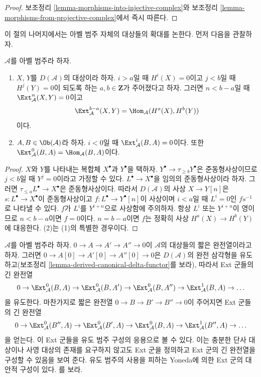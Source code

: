 \begin{proof}
보조정리 \ref{lemma-morphisms-into-injective-complex}와 보조정리
\ref{lemma-morphisms-from-projective-complex}에서 즉시 따른다.
\end{proof}

\noindent
이 절의 나머지에서는 아벨 범주 자체의 대상들의 확대를 논한다.
먼저 다음을 관찰하자.

\begin{lemma}
\label{lemma-negative-exts}
$\mathcal{A}$를 아벨 범주라 하자.
\begin{enumerate}
\item $X$, $Y$를 $D(\mathcal{A})$의 대상이라 하자.
$i > a$일 때 $H^i(X) = 0$이고 $j < b$일 때 $H^j(Y) = 0$이 되도록 하는
$a, b \in \mathbf{Z}$가 주어졌다고 하자. 그러면 $n < b - a$일 때
$\Ext^n_\mathcal{A}(X, Y) = 0$이고
$$
\Ext^{b - a}_\mathcal{A}(X, Y) = \Hom_\mathcal{A}(H^a(X), H^b(Y))
$$
이다.
\item $A, B \in \Ob(\mathcal{A})$라 하자. $i < 0$일 때
$\Ext^i_\mathcal{A}(B, A) = 0$이다. 또한
$\Ext^0_\mathcal{A}(B, A) = \Hom_\mathcal{A}(B, A)$이다.
\end{enumerate}
\end{lemma}

\begin{proof}
$X$와 $Y$를 나타내는 복합체 $X^\bullet$과 $Y^\bullet$을 택하자.
$Y^\bullet \to \tau_{\geq b}Y^\bullet$은 준동형사상이므로 $j < b$일
때 $Y^j = 0$이라고 가정할 수 있다. $L^\bullet \to X^\bullet$을 임의의
준동형사상이라 하자. 그러면
$\tau_{\leq a}L^\bullet \to X^\bullet$은 준동형사상이다. 따라서
$D(\mathcal{A})$의 사상 $X \to Y[n]$은
$s : L^\bullet \to X^\bullet$이 준동형사상이고
$f : L^\bullet \to Y^\bullet[n]$이 사상이며 $i < a$일 때
$L^i = 0$인 $fs^{-1}$로 나타낼 수 있다.
$f$가 $L^i$를 $Y^{i + n}$으로 사상함에 주의하자. 항상 $L^i$ 또는
$Y^{i + n}$이 영이므로 $n < b - a$이면 $f = 0$이다.
$n = b - a$이면 $f$는 정확히 사상 $H^a(X) \to H^b(Y)$에 대응한다.
(2)는 (1)의 특별한 경우이다.
\end{proof}

\noindent
$\mathcal{A}$를 아벨 범주라 하자. $0 \to A \to A' \to A'' \to 0$이
$\mathcal{A}$의 대상들의 짧은 완전열이라고 하자. 그러면
$0 \to A[0] \to A'[0] \to A''[0] \to 0$은
$D(\mathcal{A})$의 완전 삼각형을 유도하고(보조정리
\ref{lemma-derived-canonical-delta-functor}를 보라), 따라서 Ext 군들의
긴 완전열
$$
0 \to \Ext^0_\mathcal{A}(B, A) \to
\Ext^0_\mathcal{A}(B, A') \to
\Ext^0_\mathcal{A}(B, A'') \to
\Ext^1_\mathcal{A}(B, A) \to \ldots
$$
을 유도한다. 마찬가지로 짧은 완전열
$0 \to B \to B' \to B'' \to 0$이 주어지면 Ext 군들의 긴 완전열
$$
0 \to \Ext^0_\mathcal{A}(B'', A) \to
\Ext^0_\mathcal{A}(B', A) \to
\Ext^0_\mathcal{A}(B, A) \to
\Ext^1_\mathcal{A}(B'', A) \to \ldots
$$
을 얻는다. 이 Ext 군들을 유도 범주 구성의 응용으로 볼 수 있다.
이는 충분한 단사 대상이나 사영 대상의 존재를 요구하지 않고도 Ext 군을
정의하고 Ext 군의 긴 완전열을 구성할 수 있음을 보여 준다. 유도 범주의
사용을 피하는 Yoneda에 의한 Ext 군의 대안적 구성이 있다.
\cite{Yoneda}를 보라.

